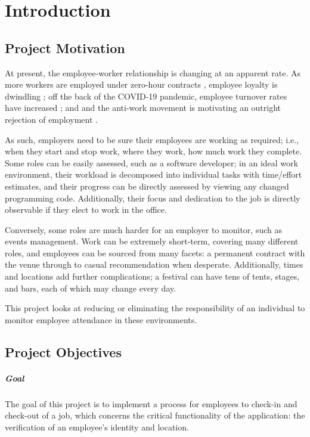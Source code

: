 \chapter{Introduction}

\section{Project Motivation}

At present, the employee-worker relationship is changing at
an apparent rate.
As more workers are employed under zero-hour contracts
\parencite{zeroHourContractsStats}, employee loyalty is
dwindling \parencite{zeroHourContractsLoyalty}; off the
back of the COVID-19 pandemic, employee turnover rates have
increased \parencite{employeeTurnover}; and and the
anti-work movement is motivating an outright rejection of
employment \parencite{antiWorkMovement}.

As such, employers need to be sure their employees are
working as required; i.e., when they start and stop work,
where they work, how much work they complete.
Some roles can be easily assessed, such as a software
developer; in an ideal work environment, their workload is
decomposed into individual tasks with time/effort
estimates, and their progress can be directly assessed by
viewing any changed programming code.
Additionally, their focus and dedication to the job is
directly observable if they elect to work in the office.

Conversely, some roles are much harder for an employer to
monitor, such as events management.
Work can be extremely short-term, covering many different
roles, and employees can be sourced from many facets: a
permanent contract with the venue through to casual
recommendation when desperate.
Additionally, times and locations add further
complications; a festival can have tens of tents, stages,
and bars, each of which may change every day.

This project looks at  reducing or eliminating the
responsibility of an individual to  monitor employee
attendance in these environments.

\section{Project Objectives}

\paragraph{Goal}
The goal of this project is to implement a process for
employees to \gls{check-in} and \gls{check-out} of a job,
which concerns the critical functionality of the
application: the verification of an employee's identity and
location.

